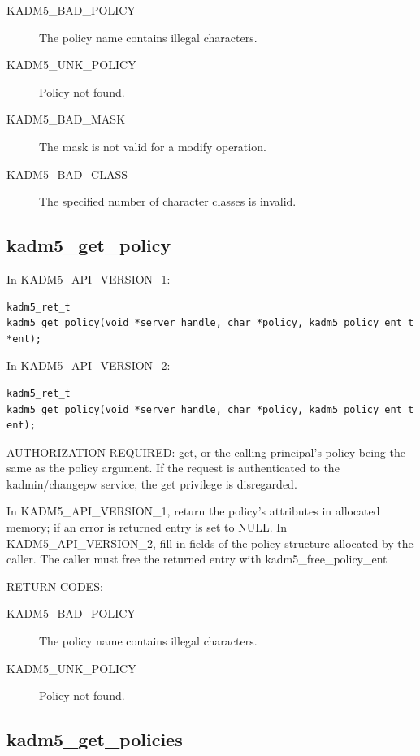 \begin{description}
\item[KADM5_BAD_POLICY] The policy name contains illegal characters.
\item[KADM5_UNK_POLICY] Policy not found.
\item[KADM5_BAD_MASK] The mask is not valid for a modify
operation.
\item[KADM5_BAD_CLASS] The specified number of character classes
is invalid.
\end{description}

\subsection{kadm5_get_policy}

In KADM5_API_VERSION_1:

\begin{verbatim}
kadm5_ret_t
kadm5_get_policy(void *server_handle, char *policy, kadm5_policy_ent_t *ent);
\end{verbatim}

In KADM5_API_VERSION_2:

\begin{verbatim}
kadm5_ret_t
kadm5_get_policy(void *server_handle, char *policy, kadm5_policy_ent_t ent);
\end{verbatim}

AUTHORIZATION REQUIRED: get, or the calling principal's policy being
the same as the policy argument.  If the request is authenticated to
the kadmin/changepw service, the get privilege is disregarded.

In KADM5_API_VERSION_1, return the policy's attributes in allocated
memory; if an error is returned entry is set to NULL.  In
KADM5_API_VERSION_2, fill in fields of the policy structure allocated
by the caller.  The caller must free the returned entry with
kadm5_free_policy_ent

RETURN CODES:

\begin{description}
\item[KADM5_BAD_POLICY] The policy name contains illegal characters.
\item[KADM5_UNK_POLICY] Policy not found.
\end{description}

\subsection{kadm5_get_policies}

